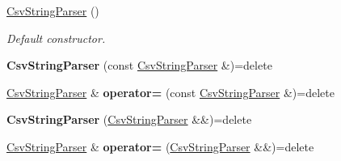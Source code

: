 \begin{DoxyCompactItemize}
\item 
\hyperlink{class_mdt_1_1_plain_text_1_1_csv_string_parser_a5a6afeedd8f074afe78fd5f161a06140}{Csv\+String\+Parser} ()
\begin{DoxyCompactList}\small\item\em Default constructor. \end{DoxyCompactList}\item 
{\bfseries Csv\+String\+Parser} (const \hyperlink{class_mdt_1_1_plain_text_1_1_csv_string_parser}{Csv\+String\+Parser} \&)=delete\hypertarget{class_mdt_1_1_plain_text_1_1_csv_string_parser_a84ca6952a8857e7e9d3259fba72528f1}{}\label{class_mdt_1_1_plain_text_1_1_csv_string_parser_a84ca6952a8857e7e9d3259fba72528f1}

\item 
\hyperlink{class_mdt_1_1_plain_text_1_1_csv_string_parser}{Csv\+String\+Parser} \& {\bfseries operator=} (const \hyperlink{class_mdt_1_1_plain_text_1_1_csv_string_parser}{Csv\+String\+Parser} \&)=delete\hypertarget{class_mdt_1_1_plain_text_1_1_csv_string_parser_a9a9adc7399b2c65bf852e17a5bb63f1e}{}\label{class_mdt_1_1_plain_text_1_1_csv_string_parser_a9a9adc7399b2c65bf852e17a5bb63f1e}

\item 
{\bfseries Csv\+String\+Parser} (\hyperlink{class_mdt_1_1_plain_text_1_1_csv_string_parser}{Csv\+String\+Parser} \&\&)=delete\hypertarget{class_mdt_1_1_plain_text_1_1_csv_string_parser_af6cf2c19b06d8de56183a4849e76ab66}{}\label{class_mdt_1_1_plain_text_1_1_csv_string_parser_af6cf2c19b06d8de56183a4849e76ab66}

\item 
\hyperlink{class_mdt_1_1_plain_text_1_1_csv_string_parser}{Csv\+String\+Parser} \& {\bfseries operator=} (\hyperlink{class_mdt_1_1_plain_text_1_1_csv_string_parser}{Csv\+String\+Parser} \&\&)=delete\hypertarget{class_mdt_1_1_plain_text_1_1_csv_string_parser_a0f4b8b043c0fd1239c2d338c68c37ec7}{}\label{class_mdt_1_1_plain_text_1_1_csv_string_parser_a0f4b8b043c0fd1239c2d338c68c37ec7}


\end{DoxyCompactItemize}
